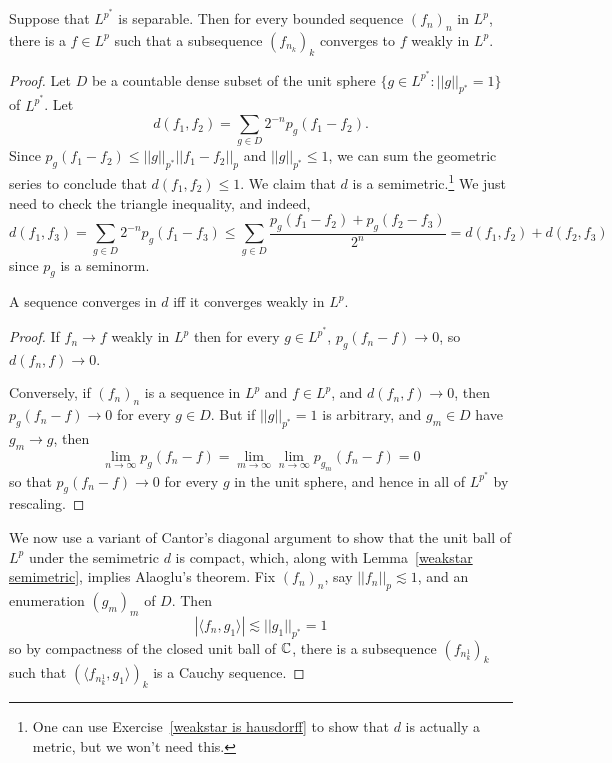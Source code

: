 \begin{theorem}
Suppose that $L^{p^{*}}$ is separable. Then for every bounded sequence ${(f_{n})}_{n}$ in $L^{p}$, there is a $f \in L^{p}$ such that a subsequence ${(f_{n_{k}})}_{k}$ converges to $f$ weakly in $L^{p}$.
\end{theorem}
\begin{proof}
Let $D$ be a countable dense subset of the unit sphere $\{g \in L^{p^{*}}: ||g||_{p^{*}} = 1\}$ of $L^{p^{*}}$.
Let
\[d(f_{1}, f_{2}) = \sum_{g \in D} 2^{-n} p_{g}(f_{1} - f_{2}).\]
Since $p_{g}(f_{1} - f_{2}) \leq ||g||_{p^{*}} ||f_{1} - f_{2}||_{p} $ and $||g||_{p^{*}} \leq 1$, we can sum the geometric series to conclude that $d(f_{1}, f_{2}) \leq 1$.
We claim that $d$ is a semimetric.\footnote{One can use Exercise~\ref{weakstar is hausdorff} to show that $d$ is actually a metric, but we won't need this.}
We just need to check the triangle inequality, and indeed,
\[d(f_{1}, f_{3}) = \sum_{g \in D} 2^{-n} p_{g}(f_{1} - f_{3}) \leq \sum_{g \in D} \frac{p_{g}(f_{1} - f_{2}) + p_{g}(f_{2} - f_{3})}{2^{n}} = d(f_{1}, f_{2}) + d(f_{2}, f_{3})\]
since $p_{g}$ is a seminorm.

\begin{lemma}\label{weakstar semimetric}
A sequence converges in $d$ iff it converges weakly in $L^{p}$.
\end{lemma}
\begin{proof}
If $f_{n} \to f$ weakly in $L^{p}$ then for every $g \in L^{p^{*}}$, $p_{g}(f_{n} - f) \to 0$, so $d(f_{n}, f) \to 0$.

Conversely, if ${(f_{n})}_{n}$ is a sequence in $L^{p}$ and $f \in L^{p}$, and $d(f_{n}, f) \to 0$, then $p_{g}(f_{n} - f) \to 0$ for every $g \in D$.
But if $||g||_{p^{*}} = 1$ is arbitrary, and $g_{m} \in D$ have $g_{m} \to g$, then
\[\lim_{n \to \infty} p_{g}(f_{n} - f) = \lim_{m \to \infty} \lim_{n \to \infty} p_{g_{m}}(f_{n} - f) = 0\]
so that $p_{g}(f_{n} - f) \to 0$ for every $g$ in the unit sphere, and hence in all of $L^{p^{*}}$ by rescaling.
\end{proof}

We now use a variant of Cantor's diagonal argument to show that the unit ball of $L^{p}$ under the semimetric $d$ is compact, which, along with Lemma~\ref{weakstar semimetric}, implies Alaoglu's theorem.
Fix ${(f_{n})}_{n}$, say $||f_{n}||_{p}  \lesssim 1$, and an enumeration ${(g_{m})}_{m}$ of $D$.
Then
\[|\langle f_{n}, g_{1}\rangle| \lesssim ||g_{1}||_{p^{*}} = 1\]
so by compactness of the closed unit ball of $\mathbb{C}$, there is a subsequence ${(f_{n_{k}^{1}})}_{k}$ such that ${(\langle f_{n_{k}^{1}}, g_{1}\rangle)}_{k}$ is a Cauchy sequence.


\end{proof}
